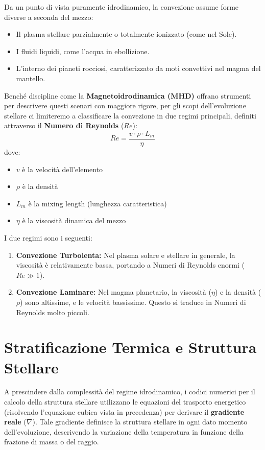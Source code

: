 Da un punto di vista puramente idrodinamico, la convezione assume forme diverse a seconda del mezzo:
\begin{itemize}
\item Il plasma stellare parzialmente o totalmente ionizzato (come nel Sole).
\item I fluidi liquidi, come l'acqua in ebollizione.
\item L'interno dei pianeti rocciosi, caratterizzato da moti convettivi nel magma del mantello.
\end{itemize}
Benché discipline come la \textbf{Magnetoidrodinamica (MHD)} offrano strumenti per descrivere questi scenari con maggiore rigore, per gli scopi dell'evoluzione stellare ci limiteremo a classificare la convezione in due regimi principali, definiti attraverso il \textbf{Numero di Reynolds} ($Re$):
\begin{equation}
Re = \frac{v \cdot \rho \cdot L_m}{\eta}
\end{equation}
dove:
\begin{itemize}
\item $v$ è la velocità dell'elemento
\item $\rho$ è la densità
\item $L_m$ è la mixing length (lunghezza caratteristica)
\item $\eta$ è la viscosità dinamica del mezzo
\end{itemize}

I due regimi sono i seguenti:
\begin{enumerate}
\item \textbf{Convezione Turbolenta:} Nel plasma solare e stellare in generale, la viscosità è relativamente bassa, portando a Numeri di Reynolds enormi ($Re \gg 1$).
\item \textbf{Convezione Laminare:} Nel magma planetario, la viscosità ($\eta$) e la densità ($\rho$) sono altissime, e le velocità bassissime. Questo si traduce in Numeri di Reynolds molto piccoli.
\end{enumerate}

\section{Stratificazione Termica e Struttura Stellare}

A prescindere dalla complessità del regime idrodinamico, i codici numerici per il calcolo della struttura stellare utilizzano le equazioni del trasporto energetico (risolvendo l'equazione cubica vista in precedenza) per derivare il \textbf{gradiente reale} ($\nabla$). Tale gradiente definisce la struttura stellare in ogni dato momento dell'evoluzione, descrivendo la variazione della temperatura in funzione della frazione di massa o del raggio.


